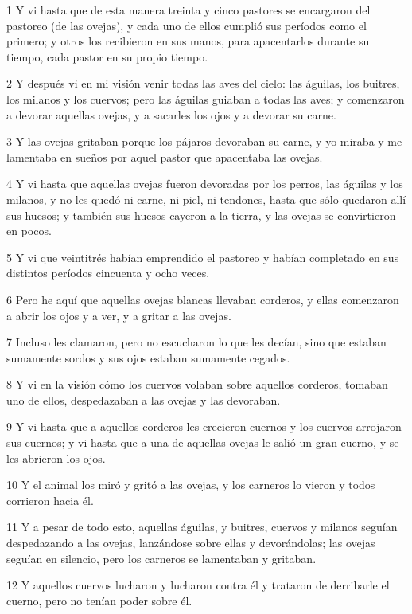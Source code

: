 \par 1 Y vi hasta que de esta manera treinta y cinco pastores se encargaron del pastoreo (de las ovejas), y cada uno de ellos cumplió sus períodos como el primero; y otros los recibieron en sus manos, para apacentarlos durante su tiempo, cada pastor en su propio tiempo.
\par 2 Y después vi en mi visión venir todas las aves del cielo: las águilas, los buitres, los milanos y los cuervos; pero las águilas guiaban a todas las aves; y comenzaron a devorar aquellas ovejas, y a sacarles los ojos y a devorar su carne.
\par 3 Y las ovejas gritaban porque los pájaros devoraban su carne, y yo miraba y me lamentaba en sueños por aquel pastor que apacentaba las ovejas.
\par 4 Y vi hasta que aquellas ovejas fueron devoradas por los perros, las águilas y los milanos, y no les quedó ni carne, ni piel, ni tendones, hasta que sólo quedaron allí sus huesos; y también sus huesos cayeron a la tierra, y las ovejas se convirtieron en pocos.
\par 5 Y vi que veintitrés habían emprendido el pastoreo y habían completado en sus distintos períodos cincuenta y ocho veces.
\par 6 Pero he aquí que aquellas ovejas blancas llevaban corderos, y ellas comenzaron a abrir los ojos y a ver, y a gritar a las ovejas.
\par 7 Incluso les clamaron, pero no escucharon lo que les decían, sino que estaban sumamente sordos y sus ojos estaban sumamente cegados.
\par 8 Y vi en la visión cómo los cuervos volaban sobre aquellos corderos, tomaban uno de ellos, despedazaban a las ovejas y las devoraban.
\par 9 Y vi hasta que a aquellos corderos les crecieron cuernos y los cuervos arrojaron sus cuernos; y vi hasta que a una de aquellas ovejas le salió un gran cuerno, y se les abrieron los ojos.
\par 10 Y el animal los miró y gritó a las ovejas, y los carneros lo vieron y todos corrieron hacia él.
\par 11 Y a pesar de todo esto, aquellas águilas, y buitres, cuervos y milanos seguían despedazando a las ovejas, lanzándose sobre ellas y devorándolas; las ovejas seguían en silencio, pero los carneros se lamentaban y gritaban.
\par 12 Y aquellos cuervos lucharon y lucharon contra él y trataron de derribarle el cuerno, pero no tenían poder sobre él.
